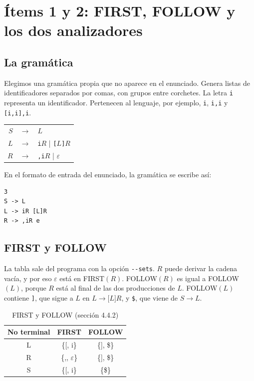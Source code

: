 \documentclass[11pt,a4paper]{article}
\begin{document}
\section{Ítems 1 y 2: FIRST, FOLLOW y los dos analizadores}

\subsection{La gramática}
Elegimos una gramática propia que no aparece en el enunciado. Genera listas de identificadores separados por comas, con grupos entre corchetes. La letra \texttt{i} representa un identificador. Pertenecen al lenguaje, por ejemplo, \texttt{i}, \texttt{i,i} y \texttt{[i,i],i}.

\begin{center}
\begin{tabular}{rcl}
$S$ & $\to$ & $L$ \\
$L$ & $\to$ & \texttt{i}$R$ \;\;|\;\; \texttt{[}$L$\texttt{]}$R$ \\
$R$ & $\to$ & \texttt{,i}$R$ \;\;|\;\; $\varepsilon$ \\
\end{tabular}
\end{center}

En el formato de entrada del enunciado, la gramática se escribe así:
\begin{verbatim}
3
S -> L
L -> iR [L]R
R -> ,iR e
\end{verbatim}

\subsection{FIRST y FOLLOW}
La tabla sale del programa con la opción \texttt{-{}-sets}. $R$ puede derivar la cadena vacía, y por eso $\varepsilon$ está en FIRST$(R)$. FOLLOW$(R)$ es igual a FOLLOW$(L)$, porque $R$ está al final de las dos producciones de $L$. FOLLOW$(L)$ contiene \texttt{]}, que sigue a $L$ en $L\to\texttt{[}L\texttt{]}R$, y \texttt{\$}, que viene de $S\to L$.

\begin{table}[ht]
\centering
\small
\caption{FIRST y FOLLOW (sección 4.4.2)}
\begin{tabular}{|c|c|c|}
\hline
No terminal & FIRST & FOLLOW \\ \hline
L & \{{[}, i\} & \{{]}, \$\} \\ \hline
R & \{,, $\varepsilon$\} & \{{]}, \$\} \\ \hline
S & \{{[}, i\} & \{\$\} \\ \hline
\end{tabular}
\end{table}
\end{document}
